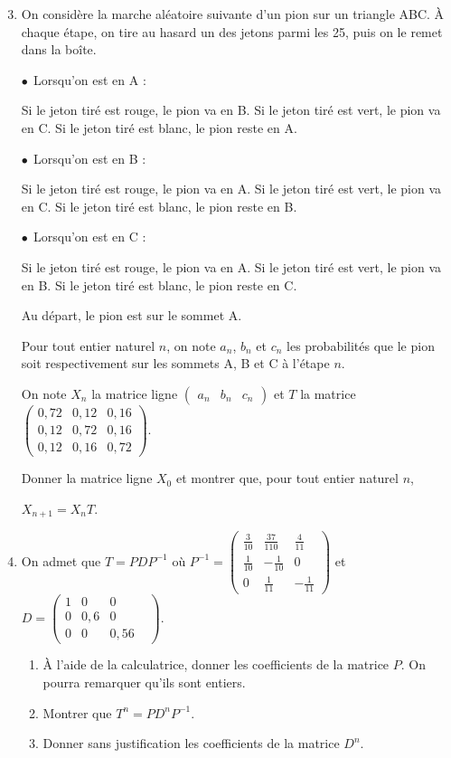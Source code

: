 \documentclass[10pt]{article}
\begin{document}
\begin{enumerate}
\setcounter{enumi}{2}

\item On considère la marche aléatoire suivante d'un pion sur un triangle ABC.
À chaque étape, on tire au hasard un des jetons parmi les 25, puis on le remet dans la boîte.

$\bullet~~$Lorsqu'on est en A :

Si le jeton tiré est rouge, le pion va en B. Si le jeton tiré est vert, le pion va en C. Si le jeton tiré est blanc, le pion reste en A.

$\bullet~~$Lorsqu'on est en B :

Si le jeton tiré est rouge, le pion va en A. Si le jeton tiré est vert, le pion va en C. Si le jeton tiré est blanc, le pion reste en B.

$\bullet~~$Lorsqu'on est en C : 

Si le jeton tiré est rouge, le pion va en A. Si le jeton tiré est vert, le pion va en B. Si le jeton tiré est blanc, le pion reste en C.

Au départ, le pion est sur le sommet A.

Pour tout entier naturel $n$, on note $a_n$,\: $b_n$ et $c_n$ les probabilités que le pion soit respectivement sur les sommets A, B et C à l'étape $n$.

On note $X_n$ la matrice ligne $\begin{pmatrix}a_n& b_n& c_n\end{pmatrix}$ et $T$ la matrice $\begin{pmatrix}0,72 &0,12 &0,16\\
 0,12 &0,72 &0,16\\
0,12& 0,16& 0,72\end{pmatrix}$.

Donner la matrice ligne $X_0$ et montrer que, pour tout entier naturel $n$,\: 
 
 $X_{n+1} = X_nT$.
\item  On admet que $T = PDP^{-1}$ où $P^{-1} = \begin{pmatrix}\frac{3}{10}&\frac{37}{110}&\frac{4}{11}\\[3pt] 
\frac{1}{10}&- \frac{1}{10}&0\\[3pt]
0&\frac{1}{11}&- \frac{1}{11}\end{pmatrix}$
et $D = \begin{pmatrix}1&0&0&\\0&0,6&0\\0&0&0,56\end{pmatrix}$.
	\begin{enumerate}
		\item À l'aide de la calculatrice, donner les coefficients de la matrice $P$. On pourra remarquer qu'ils sont entiers.
		\item Montrer que $T^n = PD^nP^{-1}$.
		\item Donner sans justification les coefficients de la matrice $D^n$.
	\end{enumerate}
	\end{enumerate}
		
\end{document}

